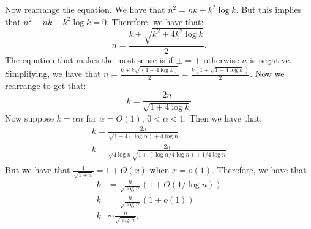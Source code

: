 \documentclass[]{article}
\begin{document}
Now rearrange the equation. We have that $n^2 = nk + k^2 \log k$. But this implies that $n^2 - nk - k^2 \log k = 0$. Therefore, we have that:
\begin{equation}
	n = \frac{k \pm \sqrt{k^2 + 4 k^2 \log k}}{2}.
\end{equation}
The equation that makes the most sense is if $\pm = +$ otherwise $n$ is negative. 
Simplifying, we have that $n = \frac{k + k \sqrt{(1 + 4\log k)}}{2} = \frac{k (1 + \sqrt{1 + 4\log k})}{2}$. Now we rearrange to get that:
\begin{equation}
	k = \frac{2n}{\sqrt{1 + 4\log k}}
\end{equation}
Now suppose $k = \alpha n$ for $\alpha = O(1)$, $0 < \alpha < 1$. 
Then we have that:
\begin{align*}
	k = \frac{2n}{\sqrt{1 + 4(\log \alpha) + 4\log n}}\\
	k = \frac{2n}{\sqrt{4\log n} \sqrt{1 + (\log \alpha/4\log n) + 1/4\log n}}
\end{align*}
But we have that $\frac{1}{\sqrt{1 + x}} = 1 + O(x)$ when $x = o(1)$. Therefore, we have that
\begin{align*}
	k &= \frac{n}{\sqrt{\log n}} \left( 1 + O(1/ \log n) \right)\\
	k &=\frac{n}{\sqrt{\log n}} (1 + o(1))\\
	k &\sim \frac{n}{\sqrt{\log n}}.
\end{align*}
\end{document}
